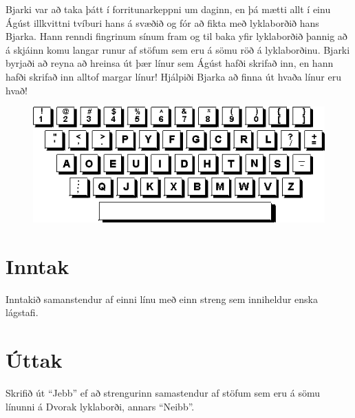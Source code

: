 
Bjarki var að taka þátt í forritunarkeppni um daginn, en þá mætti allt í einu
Ágúst illkvittni tvíburi hans á svæðið og fór að fikta með lyklaborðið hans
Bjarka. Hann renndi fingrinum sínum fram og til baka yfir lyklaborðið þannig að
á skjáinn komu langar runur af stöfum sem eru á sömu röð á lyklaborðinu. Bjarki
byrjaði að reyna að hreinsa út þær línur sem Ágúst hafði skrifað inn, en hann
hafði skrifað inn alltof margar línur! Hjálpiði Bjarka að finna út hvaða línur eru hvað!

\begin{figure}
    \includegraphics{dvorak.png}
\end{figure}

\section*{Inntak}
Inntakið samanstendur af einni línu með einn streng sem inniheldur enska lágstafi.

\section*{Úttak}
Skrifið út ``Jebb'' ef að strengurinn samastendur af stöfum sem eru á sömu
línunni á Dvorak lyklaborði, annars ``Neibb''.
